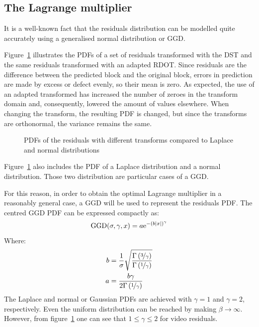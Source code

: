 \documentclass[11pt,a4paper,openright,twoside]{book}
\numberwithin{equation}{section} %
\begin{document}
\subsection{The Lagrange multiplier}
\label{sub:the_lagrange_multiplier}

It is a well-known fact that the residuals distribution can be modelled
quite accurately using a generalised normal distribution or \ac{GGD}.

Figure~\ref{fig:probability_density_functions} illustrates the \acp{PDF}
of a set of residuals transformed with the \ac{DST} and the same residuals
transformed with an adapted \ac{RDOT}.
Since residuals are the difference between the predicted block and the
original block, errors in prediction are made by excess or defect
evenly, so their mean is zero.
As expected, the use of an adapted transformed has increased the number
of zeroes in the transform domain and, consequently, lowered the amount
of values elsewhere.
When changing the transform, the resulting \ac{PDF} is changed, but
since the transforms are orthonormal, the variance remains the same.
\begin{figure}[ht]
	\centering
	\vspace{0.25\textheight} %
	\caption{\acsp{PDF} of the residuals with different transforms
	compared to Laplace and normal distributions}
	\label{fig:probability_density_functions}
\end{figure}
Figure~\ref{fig:probability_density_functions} also includes the
\ac{PDF} of a Laplace distribution and a normal distribution.
Those two distribution are particular cases of a \ac{GGD}.

For this reason, in order to obtain the optimal Lagrange multiplier in a
reasonably general case, a \ac{GGD} will be used to represent the
residuals \ac{PDF}.
The centred \ac{GGD} \ac{PDF} can be expressed compactly as:
\begin{equation}
	\text{GGD}(\sigma,\gamma,x)=
	a\text{e}^{-{\left(b\vert x \vert\right)}^\gamma}
	\label{eqn:ggd}
\end{equation}
Where:
\begin{align}
	b &= \frac{1}{\sigma}\sqrt{
	\frac{\Gamma\left(\nicefrac{3}{\gamma}\right)}
	{\Gamma \left(\nicefrac{1}{\gamma}\right)}} \\
	a &= \frac{b\gamma}{2\Gamma \left(\nicefrac{1}{\gamma}\right)}
\end{align}
The Laplace and normal or Gaussian \acp{PDF} are achieved with
$\gamma=1$ and $\gamma=2$, respectively.
Even the uniform distribution can be reached by making $\beta\to\infty$.
However, from figure~\ref{fig:probability_density_functions} one can see
that $1\le\gamma\le2$ for video residuals.
\end{document}
